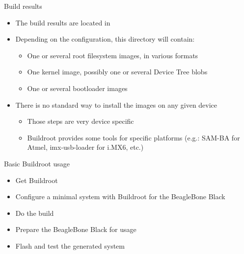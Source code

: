 \begin{frame}{Build results}
  \begin{itemize}
  \item The build results are located in 
  \item Depending on the configuration, this directory will contain:
    \begin{itemize}
    \item One or several root filesystem images, in various formats
    \item One kernel image, possibly one or several Device Tree blobs
    \item One or several bootloader images
    \end{itemize}
  \item There is no standard way to install the images on any given
    device
    \begin{itemize}
    \item Those steps are very device specific
    \item Buildroot provides some tools for specific platforms (e.g.:
      SAM-BA for Atmel, imx-usb-loader for i.MX6, etc.)
    \end{itemize}
  \end{itemize}
\end{frame}

\setuplabframe
{Basic Buildroot usage}
{
  \begin{itemize}
  \item Get Buildroot
  \item Configure a minimal system with Buildroot for the BeagleBone
    Black
  \item Do the build
  \item Prepare the BeagleBone Black for usage
  \item Flash and test the generated system
  \end{itemize}
}
